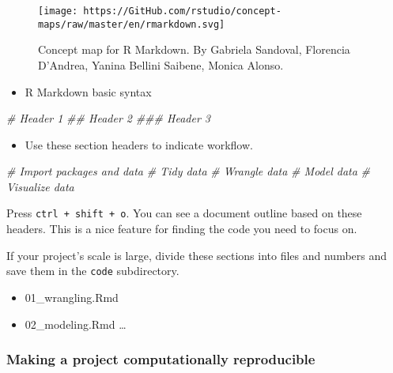 \documentclass[
]{book}
\newenvironment{Shaded}{\begin{snugshade}}{\end{snugshade}}
\newcommand{\CommentTok}[1]{\textcolor[rgb]{0.56,0.35,0.01}{\textit{#1}}}
\providecommand{\tightlist}{%
  \setlength{\itemsep}{0pt}\setlength{\parskip}{0pt}}
\begin{document}
\begin{figure}
\centering
\texttt{[image: https://GitHub.com/rstudio/concept-maps/raw/master/en/rmarkdown.svg]}
\caption{Concept map for R Markdown. By Gabriela Sandoval, Florencia D'Andrea, Yanina Bellini Saibene, Monica Alonso.}
\end{figure}

\begin{itemize}
\tightlist
\item
  R Markdown basic syntax
\end{itemize}

\begin{Shaded}
\begin{Highlighting}[]
\CommentTok{\# Header 1}
\CommentTok{\#\# Header 2}
\CommentTok{\#\#\# Header 3}
\end{Highlighting}
\end{Shaded}

\begin{itemize}
\tightlist
\item
  Use these section headers to indicate workflow.
\end{itemize}

\begin{Shaded}
\begin{Highlighting}[]
\CommentTok{\# Import packages and data}
\CommentTok{\# Tidy data}
\CommentTok{\# Wrangle data}
\CommentTok{\# Model data}
\CommentTok{\# Visualize data}
\end{Highlighting}
\end{Shaded}

Press \texttt{ctrl\ +\ shift\ +\ o}. You can see a document outline based on these headers. This is a nice feature for finding the code you need to focus on.

If your project's scale is large, divide these sections into files and numbers and save them in the \texttt{code} subdirectory.

\begin{itemize}
\tightlist
\item
  01\_wrangling.Rmd
\item
  02\_modeling.Rmd
  \ldots{}
\end{itemize}

\hypertarget{making-a-project-computationally-reproducible}{%
\subsubsection{Making a project computationally reproducible}\label{making-a-project-computationally-reproducible}}
\end{document}
